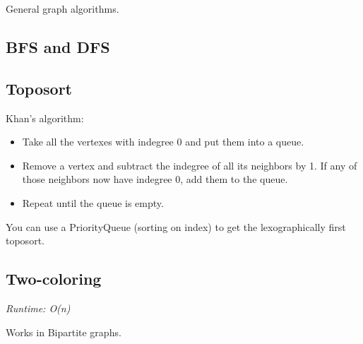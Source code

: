 
General graph algorithms.

\subsection*{BFS and DFS}

\subsection*{Toposort}

Khan's algorithm: 
\begin{itemize}
    \item Take all the vertexes with indegree 0 and put them into a queue.
    \item Remove a vertex and subtract the indegree of all its neighbors by 1. If any of those neighbors now have indegree 0, add them to the queue.
    \item Repeat until the queue is empty.
\end{itemize}

You can use a PriorityQueue (sorting on index) to get the lexographically first toposort.

\subsection*{Two-coloring}

\textit{Runtime: O(n)}

Works in Bipartite graphs.




\newpage
